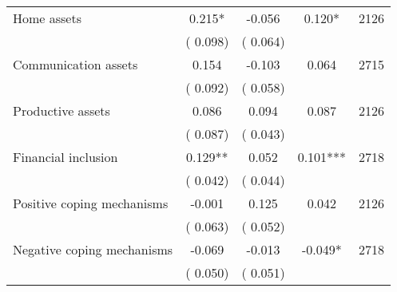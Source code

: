 \begin{tabular}{l*{4}{c}}
 Home assets                       &              0.215* &        -0.056            &              0.120*     & 2126                             \\  
                                       &          (       0.098)               &        (       0.064)                                &                                               &                                               \\      

 Communication assets                       &              0.154 &        -0.103            &              0.064     & 2715                             \\  
                                       &          (       0.092)               &        (       0.058)                                &                                               &                                               \\      

 Productive assets                       &              0.086 &         0.094            &              0.087     & 2126                             \\  
                                       &          (       0.087)               &        (       0.043)                                &                                               &                                               \\      

 Financial inclusion                       &              0.129** &         0.052            &              0.101***     & 2718                             \\  
                                       &          (       0.042)               &        (       0.044)                                &                                               &                                               \\      

 Positive coping mechanisms                       &             -0.001 &         0.125            &              0.042     & 2126                             \\  
                                       &          (       0.063)               &        (       0.052)                                &                                               &                                               \\      

 Negative coping mechanisms                       &             -0.069 &        -0.013            &             -0.049*     & 2718                             \\  
                                       &          (       0.050)               &        (       0.051)                                &                                               &                                               \\      


\end{tabular}

